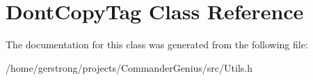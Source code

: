 \hypertarget{class_dont_copy_tag}{
\section{DontCopyTag Class Reference}
\label{class_dont_copy_tag}
}


The documentation for this class was generated from the following file:\begin{DoxyCompactItemize}
\item 
/home/gerstrong/projects/CommanderGenius/src/Utils.h\end{DoxyCompactItemize}
